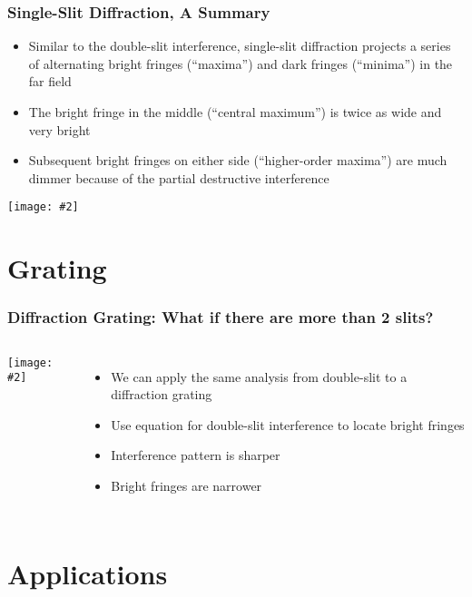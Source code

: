 \documentclass[compress,aspectratio=169]{beamer}
\newcommand{\pic}[2]{\texttt{[image: \#2]}}
\newcommand{\eq}[2]{\vspace{#1}{\LARGE\begin{displaymath}#2\end{displaymath}}}
\begin{document}
\begin{frame}
  \frametitle{Single-Slit Diffraction, A Summary}
  \begin{itemize}
  \item Similar to the double-slit interference, single-slit diffraction
    projects a series of alternating bright fringes (``maxima'') and dark
    fringes (``minima'') in the far field
  \item The bright fringe in the middle (``central maximum'') is twice as wide
    and very bright
  \item Subsequent bright fringes on either side (``higher-order maxima'') are
    much dimmer because of the partial destructive interference
  \end{itemize}
  \begin{center}
    \pic{.65}{graphics/Single_Slit_Diffraction.png}
  \end{center}
\end{frame}



\section{Grating}
\begin{frame}
  \frametitle{Diffraction Grating: What if there are more than 2 slits?}
  \begin{columns}
    \pic{1.1}{graphics/grating1.jpg}
    \begin{itemize}
    \item We can apply the same analysis from double-slit to a diffraction
      grating
    \item Use equation for double-slit interference to locate bright fringes
      
      \eq{-.2in}{
        n\lambda=d\sin\theta_n
      }
    \item Interference pattern is sharper
    \item Bright fringes are narrower
    \end{itemize}
  \end{columns}
\end{frame}


\section{Applications}
\end{document}
